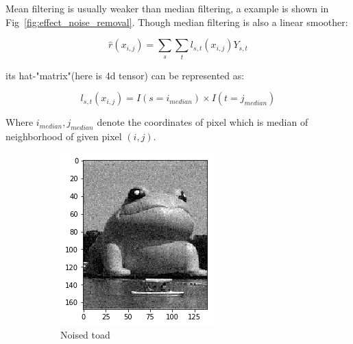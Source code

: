 \documentclass{article}
\begin{document}
Mean filtering is usually weaker than median filtering, a example is shown in Fig~\ref{fig:effect_noise_removal}. 
Though median filtering is also a linear smoother: 

$$
\hat{r}(x_{i,j})=\sum_s \sum_t l_{s,t}(x_{i,j})Y_{s,t}
$$

its hat-"matrix"(here is 4d tensor) can be represented as: 

$$ 
l_{s,t}(x_{i,j}) = I(s=i_{median}) \times I(t=j_{median}) 
$$

Where $i_{median},j_{median}$ denote the coordinates of pixel which is median of neighborhood of given pixel $(i,j)$.

\begin{figure}[htb]
  \centering
  \begin{subfigure}[b]{0.24\linewidth}
    \includegraphics[width=\linewidth]{images/noise_removal_1.png}
    \caption{Noised toad}
  \end{subfigure}
  \begin{subfigure}[b]{0.24\linewidth}

\end{subfigure}
\end{figure}
\end{document}
